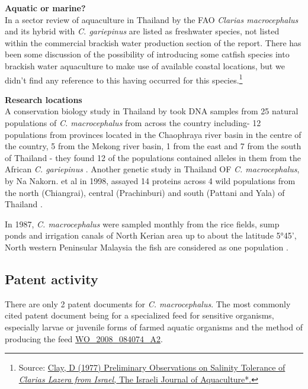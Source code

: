 \documentclass[]{book}
\let\rmarkdownfootnote\footnote%
\def\footnote{\protect\rmarkdownfootnote}
\theoremstyle{definition}
\theoremstyle{definition}
\theoremstyle{definition}
\theoremstyle{remark}
\begin{document}
\textbf{Aquatic or marine?}\\
In a sector review of aquaculture in Thailand by the FAO \emph{Clarias
macrocephalus} and its hybrid with \emph{C. gariepinus} are listed as
freshwater species, not listed within the commercial brackish water
production section of the report. There has been some discussion of the
possibility of introducing some catfish species into brackish water
aquaculture to make use of available coastal locations, but we didn't
find any reference to this having occurred for this species.\footnote{Source:
  \href{https://www.researchgate.net/profile/Douglas_Clay/publication/313167412_Preliminary_observations_on_salinity_tolerance_of_Clarias_lazera_from_Israel/links/58d73761aca2727e5ee94ab6/Preliminary-observations-on-salinity-tolerance-of-Clarias-lazera-from-Israel.pdf}{Clay,
  D (1977) Preliminary Observations on Salinity Tolerance of
  \emph{Clarias Lazera from Israel, }The Israeli Journal of
  Aquaculture*.}}

\textbf{Research locations}\\
A conservation biology study in Thailand by \citet{Na_Nakorn_2004} took
DNA samples from 25 natural populations of \emph{C. macrocephalus} from
across the country including- 12 populations from provinces located in
the Chaophraya river basin in the centre of the country, 5 from the
Mekong river basin, 1 from the east and 7 from the south of Thailand -
they found 12 of the populations contained alleles in them from the
African \emph{C. gariepinus} \citep{Na_Nakorn_2004}. Another genetic
study in Thailand OF \emph{C. macrocephalus}, by Na Nakorn. et al in
1998, assayed 14 proteins across 4 wild populations from the north
(Chiangrai), central (Prachinburi) and south (Pattani and Yala) of
Thailand \citep{Na_Nakorn_1998}.

In 1987, \emph{C. macrocephalus} were sampled monthly from the rice
fields, sump ponds and irrigation canals of North Kerian area up to
about the latitude 5°45', North western Peninsular Malaysia the fish are
considered as one population \citep{Ali_1993}.

\hypertarget{patent-activity}{%
\subsection{Patent activity}\label{patent-activity}}

There are only 2 patent documents for \emph{C. macrocephalus}. The most
commonly cited patent document being for a specialized feed for
sensitive organisms, especially larvae or juvenile forms of farmed
aquatic organisms and the method of producing the feed
\href{https://www.lens.org/lens/patent/WO_2008_084074_A2}{WO\_2008\_084074\_A2}.
\end{document}
